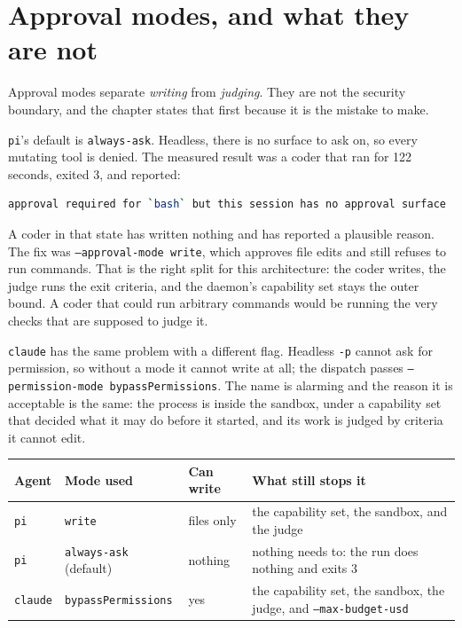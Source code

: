 \section{Approval modes, and what they are not}

Approval modes separate \emph{writing} from \emph{judging}. They are not the security
boundary, and the chapter states that first because it is the mistake to make.

\texttt{pi}'s default is \texttt{always-ask}. Headless, there is no surface to ask on, so
every mutating tool is denied. The measured result was a coder that ran for 122 seconds,
exited 3, and reported:

\begin{lstlisting}[language=bash]
approval required for `bash` but this session has no approval surface
\end{lstlisting}

A coder in that state has written nothing and has reported a plausible reason. The fix was
\texttt{--approval-mode write}, which approves file edits and still refuses to run commands.
That is the right split for this architecture: the coder writes, the judge runs the exit
criteria, and the daemon's capability set stays the outer bound. A coder that could run
arbitrary commands would be running the very checks that are supposed to judge it.

\texttt{claude} has the same problem with a different flag. Headless \texttt{-p} cannot ask
for permission, so without a mode it cannot write at all; the dispatch passes
\texttt{--permission-mode bypassPermissions}. The name is alarming and the reason it is
acceptable is the same: the process is inside the sandbox, under a capability set that decided
what it may do before it started, and its work is judged by criteria it cannot edit.

\begin{longtable}{@{}p{}p{}p{}p{}@{}}
\toprule
\textbf{Agent} & \textbf{Mode used} & \textbf{Can write} & \textbf{What still stops it} \\
\midrule
\endhead
\texttt{pi} & \texttt{write} & files only & the capability set, the sandbox, and the judge \\
\texttt{pi} & \texttt{always-ask} (default) & nothing & nothing needs to: the run does nothing and
exits 3 \\
\texttt{claude} & \texttt{bypassPermissions} & yes & the capability set, the sandbox, the judge, and
\texttt{--max-budget-usd} \\
\bottomrule
\end{longtable}

